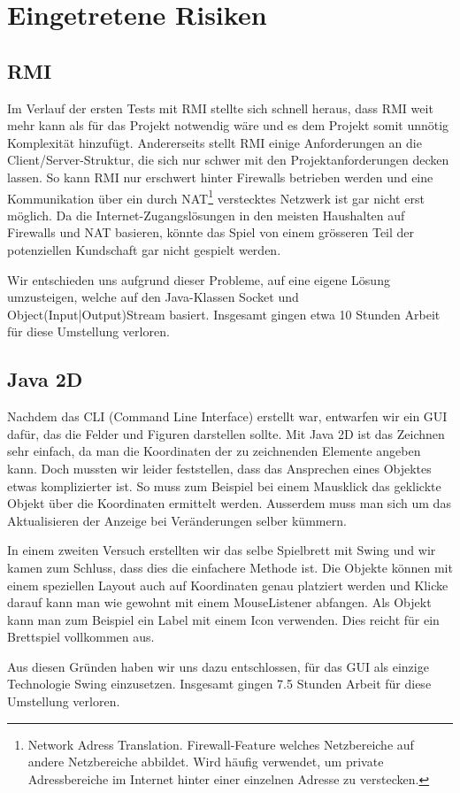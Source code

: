 \documentclass[12pt,halfparskip]{scrartcl}
\begin{document}
\clearpage
\section{Eingetretene Risiken} %
\label{eingetretene_risiken}

\subsection{RMI} %
\label{sub:rmi}

Im Verlauf der ersten Tests mit RMI stellte sich schnell heraus, dass RMI weit mehr kann als für das Projekt notwendig wäre und es dem Projekt somit unnötig Komplexität hinzufügt. Andererseits stellt RMI  einige Anforderungen an die Client/Server-Struktur, die sich nur schwer mit den Projektanforderungen decken lassen. So kann RMI nur erschwert hinter Firewalls betrieben werden und eine Kommunikation über ein durch NAT\footnote{Network Adress Translation. Firewall-Feature welches Netzbereiche auf andere Netzbereiche abbildet. Wird häufig verwendet, um private Adressbereiche im Internet hinter einer einzelnen Adresse zu verstecken.} verstecktes Netzwerk ist gar nicht erst möglich. Da die Internet-Zugangslösungen in den meisten Haushalten auf Firewalls und NAT basieren, könnte das Spiel von einem grösseren Teil der potenziellen Kundschaft gar nicht gespielt werden.

Wir entschieden uns aufgrund dieser Probleme, auf eine eigene Lösung umzusteigen, welche auf den Java-Klassen Socket und Object(Input|Output)Stream basiert. Insgesamt gingen etwa 10 Stunden Arbeit für diese Umstellung verloren.

\subsection{Java 2D} %
\label{java_2d}

Nachdem das CLI (Command Line Interface) erstellt war, entwarfen wir ein GUI dafür, das die Felder und Figuren darstellen sollte. Mit Java 2D ist das Zeichnen sehr einfach, da man die Koordinaten der zu zeichnenden Elemente angeben kann. Doch mussten wir leider feststellen, dass das Ansprechen eines Objektes etwas komplizierter ist. So muss zum Beispiel bei einem Mausklick das geklickte Objekt über die Koordinaten ermittelt werden. Ausserdem muss man sich um das Aktualisieren der Anzeige bei Veränderungen selber kümmern.

In einem zweiten Versuch erstellten wir das selbe Spielbrett mit Swing und wir kamen zum Schluss, dass dies die einfachere Methode ist. Die Objekte können mit einem speziellen Layout auch auf Koordinaten genau platziert werden und Klicke darauf kann man wie gewohnt mit einem MouseListener abfangen. Als Objekt kann man zum Beispiel ein Label mit einem Icon verwenden. Dies reicht für ein Brettspiel vollkommen aus.

Aus diesen Gründen haben wir uns dazu entschlossen, für das GUI als einzige Technologie Swing einzusetzen. Insgesamt gingen 7.5 Stunden Arbeit für diese Umstellung verloren.



\listoffigures
\end{document}
